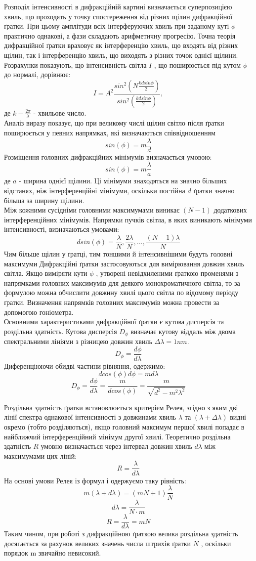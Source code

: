 Розподіл інтенсивності в дифракційній картині визначається суперпозицією хвиль, що проходять
у точку спостереження від різних щілин дифракційної ґратки. При цьому амплітуди всіх
інтерферуючих хвиль при заданому куті $\phi$ практично однакові, а фази складають арифметичну
прогресію. Точна теорія дифракційної ґратки враховує як інтерференцію хвиль, що входять від
різних щілин, так і інтерференцію хвиль, що виходять з різних точок однієї щілини. Розрахунки
показують, що інтенсивність світла $I$ , що поширюється під кутом $\phi$ до нормалі, дорівнює:
$$I = A^2 \frac{sin^2 (N\frac{kd sin\phi}{2})}{sin^2 (\frac{kd sin\phi}{2})},$$
де $k -\frac{2\pi}{\lambda}$ - хвильове число. \\
Аналіз виразу показує, що при великому числі щілин світло після ґратки поширюється у
певних напрямках, які визначаються співвідношенням
$$sin(\phi) = m \frac{\lambda}{d}$$
Розміщення головних дифракційних мінімумів визначається умовою:
$$sin(\phi) = m \frac{\lambda}{a}$$
де $a$ - ширина однієї щілини. Ці мінімуми знаходяться на значно більших відстанях, ніж
інтерференційні мінімуми, оскільки постійна $d$ ґратки значно більша за ширину щілини. \\
Між кожними сусідніми головними максимумами виникає $(N-1)$ додаткових інтерференційних
мінімумів. Напрямки пучків світла, в яких виникають мінімуми інтенсивності, визначаються
умовами:
$$d sin(\phi) = \frac{\lambda}{N}, \frac{2\lambda}{N},...,\frac{(N-1)\lambda}{N}$$
Чим більше щілин у ґратці, тим тоншими й інтенсивнішими будуть головні максимуми
Дифракційні ґратки застосовуються для вимірювання довжин хвиль світла. Якщо виміряти кути
$\phi$ , утворені невідхиленими ґраткою променями з напрямками головних максимумів для деякого
монохроматичного світла, то за формулою можна обчислити довжину хвилі цього світла по
відомому періоду ґратки. Визначення напрямків головних максимумів можна провести за
допомогою гоніометра.\\
Основними характеристиками дифракційної ґратки є кутова дисперсія та роздільна здатність.
Кутова дисперсія $D_{\phi}$ визначає кутову віддаль між двома спектральними лініями з різницею
довжин хвиль $\Delta \lambda = 1 nm$.
$$D_{\phi} = \frac{d\phi}{d\lambda}$$
Диференціюючи обидві частини рівняння, одержимо:
$$ d cos(\phi) d \phi = m d \lambda $$
$$D_{\phi} = \frac{d \phi}{d \lambda} = \frac{m}{d cos(\phi)} = \frac{m}{\sqrt{d^2 - m^2 {\lambda}^2}}$$

Роздільна здатність ґратки встановлюється критерієм Релея, згідно з яким дві лінії спектра
однакової інтенсивності з довжинами хвиль $\lambda$ та $(\lambda + \Delta \lambda)$ видні окремо (тобто розділяються),
якщо головний максимум першої хвилі попадає в найближчий інтерференційний мінімум другої
хвилі. Теоретично роздільна здатність $R$ умовно визначається через інтервал довжин хвиль $d \lambda$
між максимумами цих ліній:
$$R = \frac{\lambda}{d \lambda}$$
На основі умови Релея із формул і одержуємо таку рівність:
$$ m( \lambda + d \lambda) = (mN+1)\frac{\lambda}{N}$$
$$d \lambda = \frac{\lambda}{N \cdot m}$$
$$R = \frac{\lambda}{d \lambda} = mN$$
Таким чином, при роботі з дифракційною ґраткою велика роздільна здатність досягається за
рахунок великих значень числа штрихів ґратки $N$ , оскільки порядок m звичайно невисокий.

